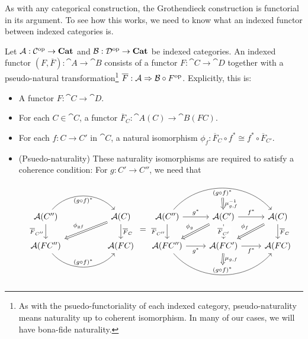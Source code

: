 \documentclass[DynamicalBook]{subfiles}
\begin{document}
{As with any categorical construction, the Grothendieck construction is
functorial in its argument. To see how this works, we need to know what an
indexed functor between indexed categories is. 

\begin{definition}
  Let $\mathcal{A} : \mathcal{C}^{\textnormal{op}} \to \textbf{Cat}$ and $\mathcal{B} : \mathcal{D}^{\textnormal{op}} \to
  \textbf{Cat}$ be indexed categories. An indexed functor $(F, \overline{F}) :
  \cat{A} \to \cat{B}$ consists of a functor $F : \cat{C} \to \cat{D}$ together
  with a pseudo-natural transformation\footnote{As with the psuedo-functoriality
  of each indexed category, pseudo-naturality means naturality up to coherent
  isomorphism. In many of our cases, we will have bona-fide naturality.} $\overline{F} : \mathcal{A} \Rightarrow
  \mathcal{B} \circ F^{\textnormal{op}}$. Explicitly, this is:
  \begin{itemize}
  \item A functor $F : \cat{C} \to \cat{D}$.
  \item For each $C \in \cat{C}$, a functor $\overline{F}_C : \cat{A}(C) \to \cat{B}(FC)$.
  \item For each $f : C \to C'$ in $\cat{C}$, a natural isomorphism $\phi_f :
    \overline{F}_{C} \circ f^{\ast} \cong f^{\ast} \circ \overline{F}_{C'}$.
  \item (Psuedo-naturality) These naturality isomorphisms are required to satisfy a coherence condition: For $g : C' \to C''$,
    we need that
    \[
\begin{tikzcd}
\cat{A}(C'') \arrow[d, "\overline{F}_{C''}"']  \arrow[rr, "(g
\circ f)^\ast"{name=Top, below}, bend left=49]  &  & \cat{A}(C) \arrow[d,
"\overline{F}_C"] \arrow[lld, "\phi_{gf}"', Rightarrow] \\
\cat{A}(FC'')  \arrow[rr, "(g \circ
f)^{\ast}"'{name=Bottom, above}, bend right=49]                          &
                                                                          & \cat{A}(FC)                                                             
\end{tikzcd}
=
\begin{tikzcd}
\cat{A}(C'') \arrow[d, "\overline{F}_{C''}"'] \arrow[r, "g^\ast"] \arrow[rr, "(g
\circ f)^\ast"{name=Top, below}, bend left=49] \ar[r, Rightarrow, from=Top,
"\mu_{g, f}\inv"] & \cat{A}(C')  \arrow[r, "f^\ast"] \arrow[d, "\overline{F}_{C'}" description] \arrow[ld, "\phi_g"', Rightarrow] & \cat{A}(C) \arrow[d, "\overline{F}_C"] \arrow[ld, "\phi_f"', Rightarrow] \\
\cat{A}(FC'') \arrow[r, "g^{\ast}"'] \arrow[rr, "(g \circ
f)^{\ast}"'{name=Bottom, above}, bend right=49]                          &
\cat{A}(FC') \arrow[Rightarrow, to=Bottom, "\mu_{g, f}"] \arrow[r, "f^{\ast}"']                                                                          & \cat{A}(FC)                                                             
\end{tikzcd}
    \]
  \end{itemize}
\end{definition}

}
\end{document}
